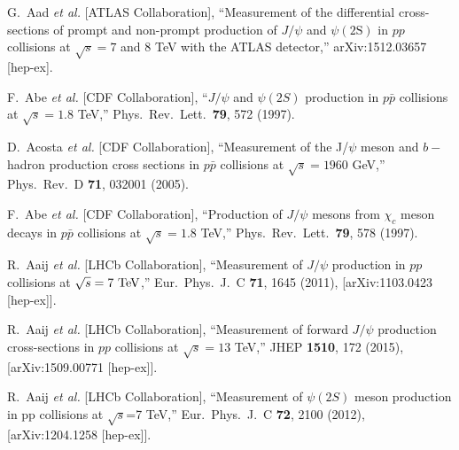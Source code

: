 \documentclass[aps,prc,preprint,superscriptaddress,showpacs,showkeys,amsmath]{revtex4-1}
\begin{document}
\begin{thebibliography}{100}
  G.~Aad {\it et al.} [ATLAS Collaboration],
  ``Measurement of the differential cross-sections of prompt and non-prompt production of $J/\psi$ 
  and $\psi(2\mathrm{S})$ in $pp$ collisions at $\sqrt{s} = 7$ and $8$ TeV with the ATLAS detector,''
  arXiv:1512.03657 [hep-ex].



  F.~Abe {\it et al.} [CDF Collaboration],
  ``$J/\psi$ and $\psi(2S)$ production in $p\bar{p}$ collisions at $\sqrt{s} = 1.8$ TeV,''
  Phys.\ Rev.\ Lett.\  {\bf 79}, 572 (1997).
  

  D.~Acosta {\it et al.}  [CDF Collaboration],
  ``Measurement of the J/$\psi$ meson and $b-$hadron production cross sections in $p\bar{p}$ collisions at $\sqrt{s} = 1960$ GeV,''
  Phys.\ Rev.\ D {\bf 71}, 032001 (2005).


  F.~Abe {\it et al.} [CDF Collaboration],
  ``Production of $J/\psi$ mesons from $\chi_c$ meson decays in $p\bar{p}$ collisions at $\sqrt{s} = 1.8$ TeV,''
  Phys.\ Rev.\ Lett.\  {\bf 79}, 578 (1997).


  R.~Aaij {\it et al.} [LHCb Collaboration],
  ``Measurement of $J/\psi$ production in $pp$ collisions at $\sqrt{s}=7~\rm{TeV}$,''
  Eur.\ Phys.\ J.\ C {\bf 71}, 1645 (2011),
  [arXiv:1103.0423 [hep-ex]].


  R.~Aaij {\it et al.} [LHCb Collaboration],
  ``Measurement of forward $J/\psi$ production cross-sections in $pp$ collisions at $\sqrt{s}=13$ TeV,''
  JHEP {\bf 1510}, 172 (2015), [arXiv:1509.00771 [hep-ex]].
 


  R.~Aaij {\it et al.} [LHCb Collaboration],
  ``Measurement of $\psi(2S)$ meson production in pp collisions at $\sqrt{s}$=7 TeV,''
  Eur.\ Phys.\ J.\ C {\bf 72}, 2100 (2012),
  [arXiv:1204.1258 [hep-ex]].










\end{thebibliography}
\end{document}
